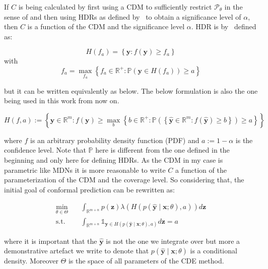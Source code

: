 If $C$ is being calculated by first using a CDM to sufficiently restrict $\mathscr{P}_\theta$ in the sense of  and then using HDRs as defined by~\cite{hyndman1996computing} to obtain a significance level of $\alpha$, then $C$ is a function of the CDM and the significance level $\alpha$. HDR is by~\cite{hyndman1996computing} defined as:

\[
    H\left(f_a\right)=\left\{\mathbf{y}: f(\mathbf{y}) \geq f_a\right\}
\]
with
\[
    f_a = \max_{f_a} \left\{f_a \in \mathbb{R^+}: \mathbb{P}\left(\mathbf{y}
    \in
    H(f_a)\right) \geq a \right\}
\]

but it can be written equivalently as below. The below formulation is also the one being used in this work from now on.

\begin{equation}
    H\left(f, a\right):=\left\{\mathbf{y} \in \mathbb{R}^m: f(\mathbf{y}) \geq
    \max_{b} \left\{b \in \mathbb{R^+}: \mathbb{P}\left(\left\{\mathbf{\hat{y}}
    \in
    \mathbb{R}^m: f(\mathbf{\hat{y}}) \geq b\right\}\right) \geq a
    \right\}\right\}
    \label{eq:HDR}
\end{equation}

where $f$ is an arbitrary probability density function (PDF) and $a := 1 - \alpha$ is the confidence level. Note that $\mathbb{P}$ here is different from the one defined in the beginning and only here for defining HDRs. As the CDM in my case is parametric like MDNs it is more reasonable to write $C$ a function of the parameterization of the CDM and the coverage level. So considering that, the initial goal of conformal prediction can be rewritten as:

\begin{align}
    \min_{\theta \in \Theta} \quad & \int_{\mathbb{R}^{m + n}} p(\mathbf{z})
    \lambda(H(p(\mathbf{\hat{y}} \mid \mathbf{x}; \theta), a))
    d\mathbf{z} \label{eq:optimal_cp_obj_func}
    \\
    \text{s.t.} \quad              & \int_{\mathbb{R}^{m + n}}
    \mathds{1}_{\mathbf{y} \in
    H(p(\mathbf{\hat{y}} \mid \mathbf{x}; \theta), a)} d\mathbf{z} = a
\end{align}

where it is important that the $\mathbf{\hat{y}}$ is not the one we integrate over but more a demonstrative artefact we write to denote that $p(\mathbf{\hat{y}} \mid \mathbf{x}; \theta)$ is a conditional density. Moreover $\Theta$ is the space of all parameters of the CDE method.

